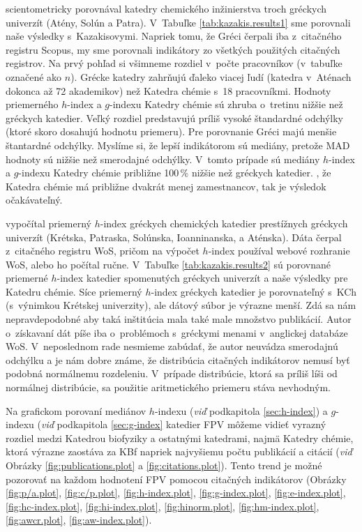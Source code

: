 \citet{Kazakis2015} scientometricky porovnával katedry chemického inžinierstva
troch gréckych univerzít (Atény, Solún a Patra).  V~Tabuľke
\ref{tab:kazakis.results1} sme porovnali naše výsledky s~Kazakisovymi. Napriek
tomu, že Gréci čerpali iba z~citačného registru Scopus, my sme porovnali
indikátory zo všetkých použitých citačných registrov. Na prvý pohľad si
všimneme rozdiel v~počte pracovníkov (v~tabuľke označené ako $n$).  Grécke
katedry zahrňujú ďaleko viacej ľudí (katedra v~Aténach dokonca až 72
akademikov) než Katedra chémie s~18 pracovníkmi.  Hodnoty priemerného $h$-index
a $g$-indexu Katedry chémie sú  zhruba o~tretinu nižšie než gréckych katedier.
Veľký rozdiel predstavujú príliš vysoké štandardné odchýlky (ktoré skoro
dosahujú hodnotu priemeru). Pre porovnanie Gréci majú menšie štantardné odchýlky.  Myslíme si, že lepší
indikátorom sú mediány, pretože MAD hodnoty sú nižšie než smerodajné odchýlky.
V~tomto prípade sú mediány $h$-index a $g$-indexu Katedry chémie približne 100\,\%
nižšie než gréckych katedier. , že Katedra chémie má
približne dvakrát menej zamestnancov, tak je výsledok očakávateľný.

\citet{Lazaridis2010} vypočítal priemerný $h$-index gréckych chemických
katedier prestížnych gréckych univerzít (Krétska, Patraska, Solúnska,
Ioanninanska, a Aténska).  Dáta čerpal z~citačného registru WoS, pričom na
výpočet $h$-index používal webové rozhranie WoS, alebo ho počítal ručne.
V~Tabuľke \ref{tab:kazakis.results2} sú porovnané priemerné $h$-index katedier
spomenutých gréckych univerzít a naše výsledky pre Katedru chémie. Síce
priemerný $h$-index gréckych katedier je porovnateľný s~KCh (s~výnimkou
Krétskej univerzity), ale dátový súbor je výrazne menší. Zdá sa nám
nepravdepodobné aby taká inštitúcia mala také male množstvo publikácií.  Autor
o~získavaní dát píše iba o~problémoch s~gréckymi menami v~anglickej databáze
WoS. V~neposlednom rade nesmieme zabúdať, že autor neuvádza smerodajnú odchýlku
a je nám dobre známe, že distribúcia citačných indikátorov nemusí byť podobná
normálnemu rozdeleniu. V~prípade distribúcie, ktorá sa príliš líši od normálnej
distribúcie, sa použitie aritmetického priemeru stáva nevhodným.

Na grafickom porovaní mediánov $h$-indexu (\emph{viď}  podkapitola \ref{sec:h-index}) a
$g$-indexu (\emph{viď}  podkapitola \ref{sec:g-index} katedier FPV môžeme vidieť vyrazný
rozdiel medzi Katedrou biofyziky a ostatnými katedrami, najmä Katedry chémie,
ktorá výrazne zaostáva za KBf napriek najvyšiemu počtu publikácií a citácií
(\emph{viď}  Obrázky \ref{fig:publications.plot} a \ref{fig:citations.plot}).  Tento
trend je možné pozorovať na každom hodnotení FPV pomocou citačných indikátorov
(Obrázky \ref{fig:p/a.plot}, \ref{fig:c/p.plot}, \ref{fig:h-index.plot},
\ref{fig:g-index.plot}, \ref{fig:e-index.plot}, \ref{fig:hc-index.plot}, \ref{fig:hi-index.plot},
\ref{fig:hinorm.plot}, \ref{fig:hm-index.plot}, \ref{fig:awcr.plot}, \ref{fig:aw-index.plot}).

